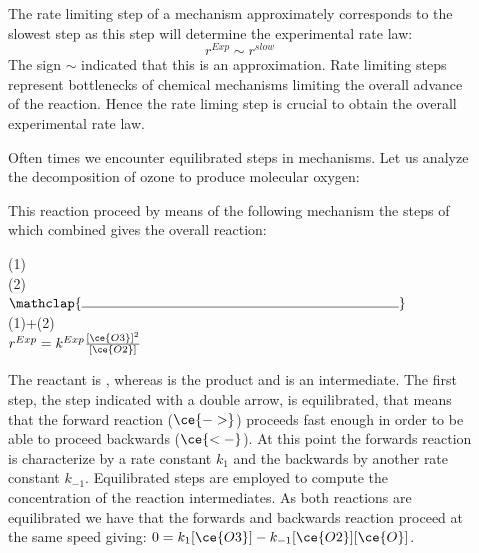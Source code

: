 \documentclass[main.tex]{subfiles}
\newcommand\chapterlabel{kinetics}
\begin{document}
\begin{description}
\item[] 
The rate limiting step of a mechanism approximately corresponds to the slowest step as this step will determine the experimental rate law:
\begin{equation}
\boxed{  
 r^{Exp}\sim r^{slow}}
\label{\chapterlabel:equation5}
\end{equation}
The sign $\sim$ indicated that this is an approximation. Rate limiting steps represent bottlenecks of chemical mechanisms limiting the overall advance of the reaction. Hence the rate liming step is crucial to obtain the overall experimental rate law.
\item[] 
Often times we encounter equilibrated steps in mechanisms. Let us analyze the decomposition of ozone to produce molecular oxygen:
\begin{center} \end{center}
This reaction proceed by means of the following mechanism the steps of which combined gives the overall reaction:
\begin{center}(1)\hfill{} \\
(2)\hfill{} 
\\$\mathclap{\rule{8cm}{0.4pt}}$\\
(1)+(2)\hfill{}\\{ \hfill $r^{Exp}=k^{Exp}\frac{[\ce{O3}]^2}{[\ce{O2}]}$} 
\end{center}
The reactant is , whereas  is the product and  is an intermediate. The first step, the step indicated with a double arrow,  is equilibrated, that means that the forward reaction ($\ce{->}$) proceeds fast enough in order to be able to proceed backwards ($\ce{<-}$). At this point the forwards reaction is characterize by a rate constant $k_1$ and the backwards by another rate constant $k_{-1}$. 
Equilibrated steps are employed to compute the concentration of the reaction intermediates.
As both reactions are equilibrated we have that the forwards and backwards reaction proceed at the same speed giving: $0=k_1[\ce{O3}]-k_{-1}[\ce{O2}][\ce{O}]$. 

\end{description}
\end{document}
